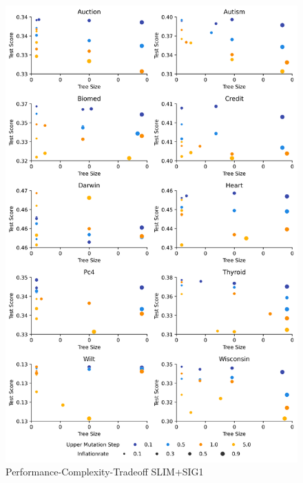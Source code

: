 
    \begin{figure}[H]
    \centering
    \includegraphics[width=\linewidth]{../Latex/Chapters/Figures/Results/inflationrate_test_performance_complexity_tradeoff_plussig1.png}
    \caption{Performance-Complexity-Tradeoff SLIM+SIG1}
    \label{fig:inflationrate_test_performance_complexity_tradeoff_plussig1}
    \end{figure}
    
